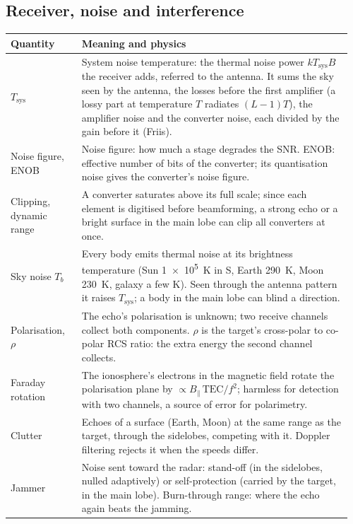 \documentclass[11pt,a4paper]{article}
\newcommand{\Tsys}{T_{\mathrm{sys}}}
\begin{document}
\subsection{Receiver, noise and interference}
{\small
\begin{longtable}{@{}p{0.2\linewidth}p{0.76\linewidth}@{}}
\toprule
Quantity & Meaning and physics\\
\midrule
\endhead
$\Tsys$ & System noise temperature: the thermal noise power $kT_{\mathrm{sys}}B$ the receiver adds, referred to the
antenna. It sums the sky seen by the antenna, the losses before the first amplifier (a lossy part at temperature $T$
radiates $(L-1)T$), the amplifier noise and the converter noise, each divided by the gain before it (Friis).\\
Noise figure, ENOB & Noise figure: how much a stage degrades the SNR. ENOB: effective number of bits of the converter;
its quantisation noise gives the converter's noise figure.\\
Clipping, dynamic range & A converter saturates above its full scale; since each element is digitised before
beamforming, a strong echo or a bright surface in the main lobe can clip all converters at once.\\
Sky noise $T_b$ & Every body emits thermal noise at its brightness temperature (Sun \SI{1e5}{K} in S, Earth \SI{290}{K},
Moon \SI{230}{K}, galaxy a few K). Seen through the antenna pattern it raises $\Tsys$; a body in the main lobe can
blind a direction.\\
Polarisation, $\rho$ & The echo's polarisation is unknown; two receive channels collect both components. $\rho$ is the
target's cross-polar to co-polar RCS ratio: the extra energy the second channel collects.\\
Faraday rotation & The ionosphere's electrons in the magnetic field rotate the polarisation plane by $\propto
B_\parallel\,\mathrm{TEC}/f^2$; harmless for detection with two channels, a source of error for polarimetry.\\
Clutter & Echoes of a surface (Earth, Moon) at the same range as the target, through the sidelobes, competing with it.
Doppler filtering rejects it when the speeds differ.\\
Jammer & Noise sent toward the radar: stand-off (in the sidelobes, nulled adaptively) or self-protection (carried by
the target, in the main lobe). Burn-through range: where the echo again beats the jamming.\\
\bottomrule
\end{longtable}}
\end{document}
